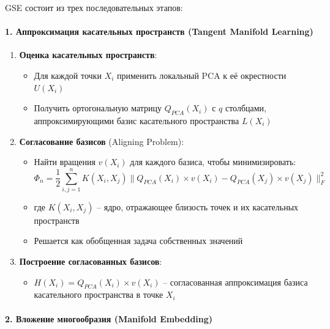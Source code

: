 \documentclass[a4paper,12pt]{article}
\begin{document}
GSE состоит из трех последовательных этапов:

\paragraph{1. Аппроксимация касательных пространств (Tangent Manifold Learning)}

\begin{enumerate}
    \item \textbf{Оценка касательных пространств}:
    \begin{itemize}
        \item Для каждой точки $X_i$ применить локальный PCA к её окрестности $U(X_i)$
        \item Получить ортогональную матрицу $Q_{PCA}(X_i)$ с $q$ столбцами, аппроксимирующими базис касательного пространства $L(X_i)$
    \end{itemize}

    \item \textbf{Согласование базисов} (Aligning Problem):
    \begin{itemize}
        \item Найти вращения $v(X_i)$ для каждого базиса, чтобы минимизировать:
        \begin{equation}
            \Phi_n = \frac{1}{2} \sum_{i,j=1}^n K(X_i, X_j) \|Q_{PCA}(X_i) \times v(X_i) - Q_{PCA}(X_j) \times v(X_j)\|_F^2
        \end{equation}
        \item где $K(X_i, X_j)$ -- ядро, отражающее близость точек и их касательных пространств
        \item Решается как обобщенная задача собственных значений
    \end{itemize}

    \item \textbf{Построение согласованных базисов}:
    \begin{itemize}
        \item $H(X_i) = Q_{PCA}(X_i) \times v(X_i)$ -- согласованная аппроксимация базиса касательного пространства в точке $X_i$
    \end{itemize}
\end{enumerate}

\paragraph{2. Вложение многообразия (Manifold Embedding)}
\end{document}
